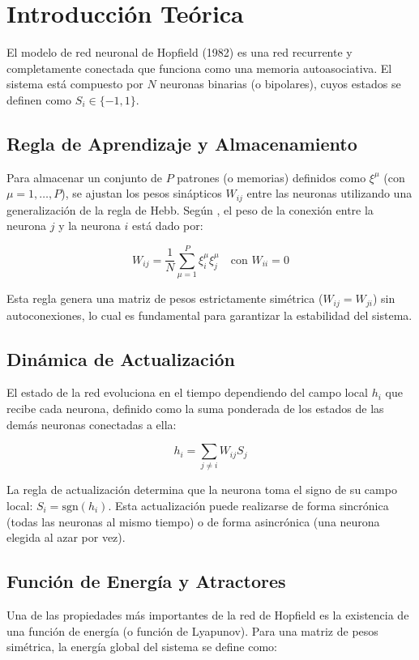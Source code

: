 \section{Introducción Teórica}
\label{sec:intro}

El modelo de red neuronal de Hopfield (1982) es una red recurrente y completamente conectada que funciona como una memoria autoasociativa. El sistema está compuesto por $N$ neuronas binarias (o bipolares), cuyos estados se definen como $S_i \in \{-1, 1\}$. 

\subsection{Regla de Aprendizaje y Almacenamiento}
Para almacenar un conjunto de $P$ patrones (o memorias) definidos como $\xi^\mu$ (con $\mu = 1, \dots, P$), se ajustan los pesos sinápticos $W_{ij}$ entre las neuronas utilizando una generalización de la regla de Hebb. Según \cite{hertz1991}, el peso de la conexión entre la neurona $j$ y la neurona $i$ está dado por:

\begin{equation}
	W_{ij} = \frac{1}{N} \sum_{\mu=1}^{P} \xi_i^\mu \xi_j^\mu \quad \text{con } W_{ii} = 0
	\label{eq:hebb}
\end{equation}

Esta regla genera una matriz de pesos estrictamente simétrica ($W_{ij} = W_{ji}$) sin autoconexiones, lo cual es fundamental para garantizar la estabilidad del sistema.

\subsection{Dinámica de Actualización}
El estado de la red evoluciona en el tiempo dependiendo del campo local $h_i$ que recibe cada neurona, definido como la suma ponderada de los estados de las demás neuronas conectadas a ella:

\begin{equation}
	h_i = \sum_{j \neq i} W_{ij} S_j
	\label{eq:campo_local}
\end{equation}

La regla de actualización determina que la neurona toma el signo de su campo local: $S_i = \text{sgn}(h_i)$. Esta actualización puede realizarse de forma sincrónica (todas las neuronas al mismo tiempo) o de forma asincrónica (una neurona elegida al azar por vez).

\subsection{Función de Energía y Atractores}
Una de las propiedades más importantes de la red de Hopfield es la existencia de una función de energía (o función de Lyapunov). Para una matriz de pesos simétrica, la energía global del sistema se define como:

